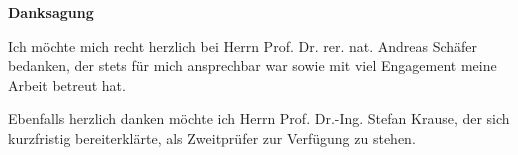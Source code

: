 {\Large \textbf{Danksagung}}
\vspace*{0.5cm}

Ich möchte mich recht herzlich bei Herrn Prof. Dr. rer. nat. Andreas Schäfer bedanken, der stets
für mich ansprechbar war sowie mit viel Engagement meine Arbeit betreut hat.

Ebenfalls herzlich danken möchte ich Herrn Prof. Dr.-Ing. Stefan Krause, der sich kurzfristig bereiterklärte, als Zweitprüfer zur Verfügung zu stehen. 